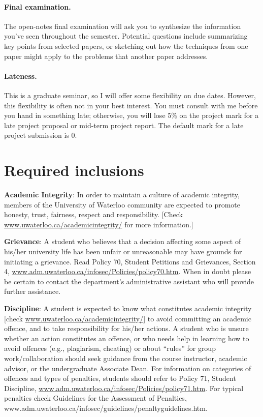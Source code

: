 \documentclass{article}
\begin{document}
\paragraph{Final examination.} The open-notes final examination will ask you to
synthesize the information you've seen throughout the
semester. Potential questions include summarizing key points from
selected papers, or sketching out how the techniques from one paper
might apply to the problems that another paper addresses.

\paragraph{Lateness.} This is a graduate seminar, so I will offer some 
flexibility on due dates. However, this flexibility is often not in
your best interest. You must consult with me before you hand in
something late; otherwise, you will lose 5\% on the project mark for a
late project proposal or mid-term project report. The default mark for
a late project submission is 0.

\section*{Required inclusions}
{\bf Academic Integrity}: In order to maintain a culture of academic
integrity, members of the University of Waterloo community are
expected to promote honesty, trust, fairness, respect and
responsibility. [Check \url{www.uwaterloo.ca/academicintegrity/} for more
  information.]

\vspace*{1em}\noindent
{\bf Grievance}: A student who believes that a decision affecting some
aspect of his/her university life has been unfair or unreasonable may
have grounds for initiating a grievance. Read Policy 70, Student
Petitions and Grievances, Section 4,
\url{www.adm.uwaterloo.ca/infosec/Policies/policy70.htm}.  When in doubt
please be certain to contact the department’s administrative assistant
who will provide further assistance.

\vspace*{1em}\noindent
{\bf Discipline}: A student is expected to know what constitutes academic
integrity [check \url{www.uwaterloo.ca/academicintegrity/}] to avoid
committing an academic offence, and to take responsibility for his/her
actions. A student who is unsure whether an action constitutes an
offence, or who needs help in learning how to avoid offences (e.g.,
plagiarism, cheating) or about “rules” for group work/collaboration
should seek guidance from the course instructor, academic advisor, or
the undergraduate Associate Dean. For information on categories of
offences and types of penalties, students should refer to Policy 71,
Student Discipline,
\url{www.adm.uwaterloo.ca/infosec/Policies/policy71.htm}. For typical
penalties check Guidelines for the Assessment of Penalties,
www.adm.uwaterloo.ca/infosec/guidelines/penaltyguidelines.htm.
\end{document}
